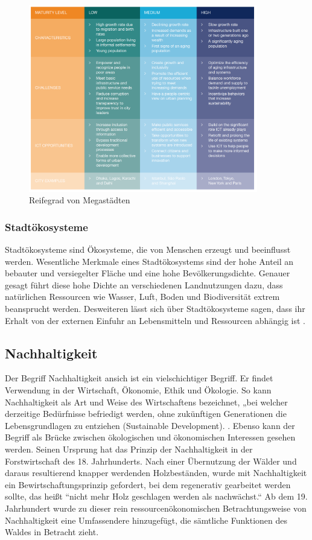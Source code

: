 \documentclass{article}
\begin{document}
\begin{figure}[h]
\centering
\includegraphics[width=10cm]{image_folder/urban_reifegrad.png}
\caption{Reifegrad von Megastädten}
\label{figUrbanRf}
\end{figure}

\subsubsection{Stadtökosysteme}
Stadtökosysteme sind Ökosysteme, die von Menschen erzeugt und beeinflusst werden. Wesentliche Merkmale eines Stadtökosystems sind der hohe Anteil an bebauter und versiegelter Fläche und eine hohe Bevölkerungsdichte. Genauer gesagt führt diese hohe Dichte an verschiedenen Landnutzungen dazu, dass natürlichen Ressourcen wie Wasser, Luft, Boden und Biodiversität extrem beansprucht werden. Desweiteren lässt sich über Stadtökosysteme sagen, dass ihr Erhalt von der externen Einfuhr an Lebensmitteln und Ressourcen abhängig ist  \cite[S.61]{BreusteStadtokosystemeEntwicklung}.


\subsection{Nachhaltigkeit}

Der Begriff Nachhaltigkeit ansich ist ein vielschichtiger Begriff. Er findet Verwendung in der Wirtschaft, Ökonomie, Ethik und Ökologie. So kann Nachhaltigkeit als Art und Weise des Wirtschaftens bezeichnet, „bei welcher derzeitige Bedürfnisse befriedigt werden, ohne zukünftigen Generationen die Lebensgrundlagen zu entziehen (Sustainable Development). \cite{DefinitionWirtschaftslexikonb}. Ebenso kann der Begriff als Brücke zwischen ökologischen und ökonomischen Interessen gesehen werden. Seinen Ursprung hat das Prinzip der Nachhaltigkeit in der Forstwirtschaft des 18. Jahrhunderts. Nach einer Übernutzung der Wälder und daraus resultierend knapper werdenden Holzbeständen, wurde mit Nachhaltigkeit ein Bewirtschaftungsprinzip gefordert, bei dem regenerativ gearbeitet werden sollte, das heißt “nicht mehr Holz geschlagen werden als nachwächst.“\cite{NachhaltigeBrockhaus.de}
Ab dem 19. Jahrhundert wurde zu dieser rein ressourcenökonomischen Betrachtungsweise von Nachhaltigkeit eine Umfassendere hinzugefügt, die sämtliche Funktionen des Waldes in Betracht zieht.
\end{document}
